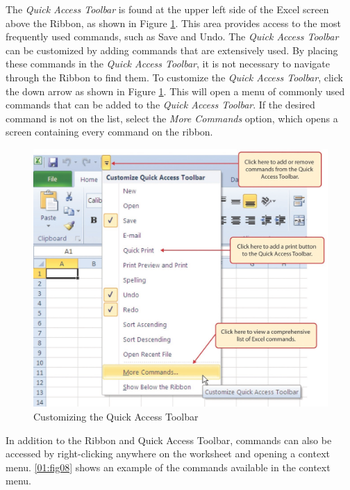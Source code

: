 The \textit{Quick Access Toolbar} is found at the upper left side of the Excel screen above the Ribbon, as shown in Figure \ref{01:fig07}. This area provides access to the most frequently used commands, such as Save and Undo. The \textit{Quick Access Toolbar} can be customized by adding commands that are extensively used. By placing these commands in the \textit{Quick Access Toolbar}, it is not necessary to navigate through the Ribbon to find them. To customize the \textit{Quick Access Toolbar}, click the down arrow as shown in Figure \ref{01:fig07}. This will open a menu of commonly used commands that can be added to the \textit{Quick Access Toolbar}. If the desired command is not on the list, select the \textit{More Commands} option, which opens a screen containing every command on the ribbon.

\begin{figure}[H]
	\centering
	\includegraphics[width=\maxwidth{.95\linewidth}]{gfx/ch01_fig07}
	\caption{Customizing the Quick Access Toolbar}
	\label{01:fig07}
\end{figure}

In addition to the Ribbon and Quick Access Toolbar, commands can also be accessed by right-clicking anywhere on the worksheet and opening a context menu. \ref{01:fig08} shows an example of the commands available in the context menu.

